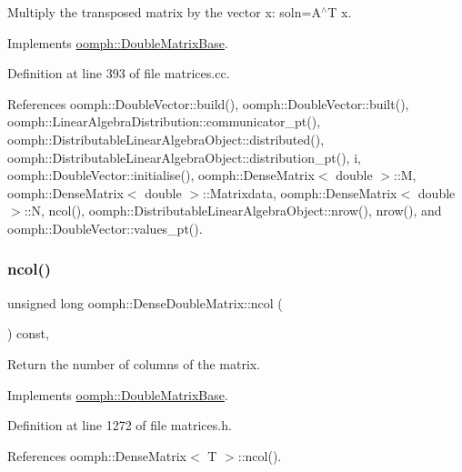 Multiply the transposed matrix by the vector x\+: soln=A$^\wedge$T x. 



Implements \hyperlink{classoomph_1_1DoubleMatrixBase_a843d44405b70da1d96b43218a21e6ffc}{oomph\+::\+Double\+Matrix\+Base}.



Definition at line 393 of file matrices.\+cc.



References oomph\+::\+Double\+Vector\+::build(), oomph\+::\+Double\+Vector\+::built(), oomph\+::\+Linear\+Algebra\+Distribution\+::communicator\+\_\+pt(), oomph\+::\+Distributable\+Linear\+Algebra\+Object\+::distributed(), oomph\+::\+Distributable\+Linear\+Algebra\+Object\+::distribution\+\_\+pt(), i, oomph\+::\+Double\+Vector\+::initialise(), oomph\+::\+Dense\+Matrix$<$ double $>$\+::M, oomph\+::\+Dense\+Matrix$<$ double $>$\+::\+Matrixdata, oomph\+::\+Dense\+Matrix$<$ double $>$\+::N, ncol(), oomph\+::\+Distributable\+Linear\+Algebra\+Object\+::nrow(), nrow(), and oomph\+::\+Double\+Vector\+::values\+\_\+pt().

\mbox{\label{classoomph_1_1DenseDoubleMatrix_aec36d12984999f29f5fc21feea55df1d}} 
\subsubsection{\texorpdfstring{ncol()}{ncol()}}
{\footnotesize\ttfamily unsigned long oomph\+::\+Dense\+Double\+Matrix\+::ncol (\begin{DoxyParamCaption}{ }\end{DoxyParamCaption}) const\hspace{0.3cm}{\ttfamily [inline]}, {\ttfamily [virtual]}}



Return the number of columns of the matrix. 



Implements \hyperlink{classoomph_1_1DoubleMatrixBase_a253feffbf1db1976cdd86c6134c50abe}{oomph\+::\+Double\+Matrix\+Base}.



Definition at line 1272 of file matrices.\+h.



References oomph\+::\+Dense\+Matrix$<$ T $>$\+::ncol().



